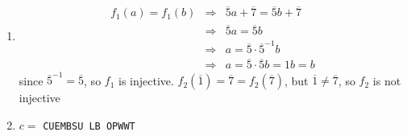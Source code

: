 \documentclass[a4paper]{scrreprt}
\newcommand\ol\overline
\begin{document}
\begin{enumerate}
    \item \begin{eqnarray*}
            f_1(a)=f_1(b) &\Rightarrow& \ol 5 a + \ol 7 = \ol 5 b + \ol 7\\
            &\Rightarrow& \ol 5 a = \ol 5 b \\
            &\Rightarrow& a = \ol 5\cdot \ol 5^{-1} b \\
            &\Rightarrow& a = \ol 5\cdot\ol 5 b = 1 b = b
        \end{eqnarray*}
            since $\ol 5^{-1} = \ol 5$, so $f_1$ is injective.
        $f_2(\ol 1) = \ol 7 = f_2(\ol 7)$, but $\ol 1 \neq \ol 7$, so $f_2$ is not injective

    \item $c=$ \texttt{CUEMBSU LB OPWWT}
\end{enumerate}
\end{document}
